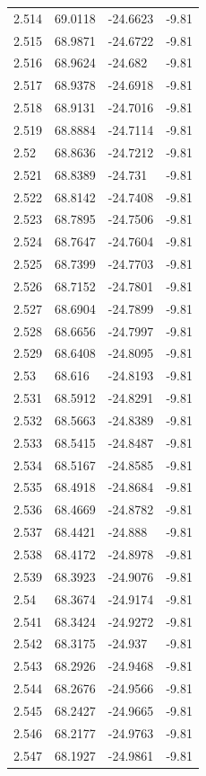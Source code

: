 \begin{tabular}{llll}
2.514 & 69.0118 & -24.6623 & -9.81 \\
2.515 & 68.9871 & -24.6722 & -9.81 \\
2.516 & 68.9624 & -24.682 & -9.81 \\
2.517 & 68.9378 & -24.6918 & -9.81 \\
2.518 & 68.9131 & -24.7016 & -9.81 \\
2.519 & 68.8884 & -24.7114 & -9.81 \\
2.52 & 68.8636 & -24.7212 & -9.81 \\
2.521 & 68.8389 & -24.731 & -9.81 \\
2.522 & 68.8142 & -24.7408 & -9.81 \\
2.523 & 68.7895 & -24.7506 & -9.81 \\
2.524 & 68.7647 & -24.7604 & -9.81 \\
2.525 & 68.7399 & -24.7703 & -9.81 \\
2.526 & 68.7152 & -24.7801 & -9.81 \\
2.527 & 68.6904 & -24.7899 & -9.81 \\
2.528 & 68.6656 & -24.7997 & -9.81 \\
2.529 & 68.6408 & -24.8095 & -9.81 \\
2.53 & 68.616 & -24.8193 & -9.81 \\
2.531 & 68.5912 & -24.8291 & -9.81 \\
2.532 & 68.5663 & -24.8389 & -9.81 \\
2.533 & 68.5415 & -24.8487 & -9.81 \\
2.534 & 68.5167 & -24.8585 & -9.81 \\
2.535 & 68.4918 & -24.8684 & -9.81 \\
2.536 & 68.4669 & -24.8782 & -9.81 \\
2.537 & 68.4421 & -24.888 & -9.81 \\
2.538 & 68.4172 & -24.8978 & -9.81 \\
2.539 & 68.3923 & -24.9076 & -9.81 \\
2.54 & 68.3674 & -24.9174 & -9.81 \\
2.541 & 68.3424 & -24.9272 & -9.81 \\
2.542 & 68.3175 & -24.937 & -9.81 \\
2.543 & 68.2926 & -24.9468 & -9.81 \\
2.544 & 68.2676 & -24.9566 & -9.81 \\
2.545 & 68.2427 & -24.9665 & -9.81 \\
2.546 & 68.2177 & -24.9763 & -9.81 \\
2.547 & 68.1927 & -24.9861 & -9.81 \\

\end{tabular}
